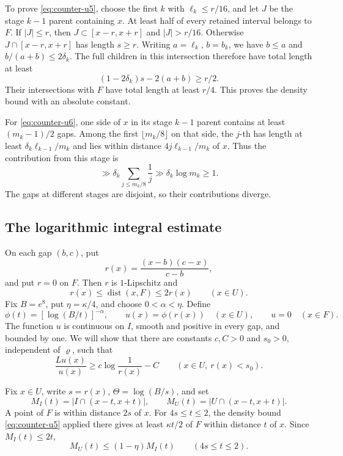 \documentclass[11pt]{article}
\theoremstyle{remark}
\numberwithin{equation}{section}
\begin{document}
To prove \eqref{eq:counter-u5}, choose the first \(k\) with
\(\ell_k\le r/16\), and let \(J\) be the stage \(k-1\) parent containing
\(x\). At least half of every retained interval belongs to \(F\).
If \(|J|\le r\), then \(J\subset[x-r,x+r]\) and \(|J|>r/16\).
Otherwise \(J\cap[x-r,x+r]\) has length \(s\ge r\).
Writing \(a=\ell_k\), \(b=b_k\), we have \(b\le a\) and
\(b/(a+b)\le2\delta_k\). The full children in this intersection
therefore have total length at least
\[
 (1-2\delta_k)s-2(a+b)\ge r/2.
\]
Their intersections with \(F\) have total length at least \(r/4\).
This proves the density bound with an absolute constant.

For \eqref{eq:counter-u6}, one side of \(x\) in its stage \(k-1\)
parent contains at least \((m_k-1)/2\) gaps. Among the first
\(\lfloor m_k/8\rfloor\) on that side, the \(j\)-th has length at least
\(\delta_k\ell_{k-1}/m_k\) and lies within distance
\(4j\ell_{k-1}/m_k\) of \(x\). Thus the contribution from this stage is
\[
 \gg\delta_k\sum_{j\le m_k/8}\frac1j
 \gg\delta_k\log m_k\ge1.
\]
The gaps at different stages are disjoint, so their contributions
diverge.

\subsection{The logarithmic integral estimate}\label{subsec:counter-integral}

On each gap \((b,c)\), put
\[
 r(x)=\frac{(x-b)(c-x)}{c-b},
\]
and put \(r=0\) on \(F\). Then \(r\) is \(1\)-Lipschitz and
\[
 r(x)\le\operatorname{dist}(x,F)\le2r(x)\qquad(x\in U).
\]
Fix \(B=e^8\), put \(\eta=\kappa/4\), and choose \(0<\alpha<\eta\).
Define
\begin{equation}\label{eq:counter-u8}
 \phi(t)=[\log(B/t)]^{-\alpha},\qquad
 u(x)=\phi(r(x))\quad(x\in U),\qquad u=0\quad(x\in F).
\end{equation}
The function \(u\) is continuous on \(I\), smooth and positive in every
gap, and bounded by one. We will show that there are constants
\(c,C>0\) and \(s_0>0\), independent of \(\varrho\), such that
\begin{equation}\label{eq:counter-u9}
 \frac{Lu(x)}{u(x)}\ge c\log\frac1{r(x)}-C
 \qquad(x\in U,\ r(x)<s_0).
\end{equation}

Fix \(x\in U\), write \(s=r(x)\), \(\Theta=\log(B/s)\), and set
\[
 M_I(t)=|I\cap(x-t,x+t)|,\qquad
 M_U(t)=|U\cap(x-t,x+t)|.
\]
A point of \(F\) is within distance \(2s\) of \(x\).
For \(4s\le t\le2\), the density bound \eqref{eq:counter-u5} applied
there gives at least \(\kappa t/2\) of \(F\) within distance \(t\)
of \(x\). Since \(M_I(t)\le2t\),
\begin{equation}\label{eq:counter-u10}
 M_U(t)\le(1-\eta)M_I(t)\qquad(4s\le t\le2).
\end{equation}
\end{document}

